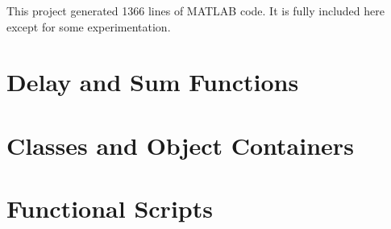 This project generated 1366 lines of MATLAB code. It is fully included here except for some experimentation.

\label{app:matlab_code}
\lstset{language=Matlab, style=Matlab-editor}

\section{Delay and Sum Functions}
\label{appB:matlab_functions}






\section{Classes and Object Containers}
\label{appB:matlab_OOP}





\section{Functional Scripts}
\label{appB:matlab_scripts}



